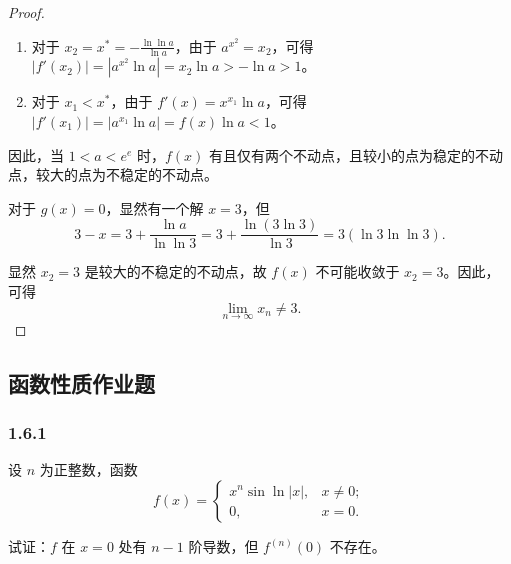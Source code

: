 \documentclass[12pt]{ctexart}
\begin{document}
\begin{proof}
\begin{enumerate}
    \item 对于 $x_2 = x^* = -\frac{\ln \ln a}{\ln a}$，由于 $a^{x^2} = x_2$，可得 $|f'(x_2)| = |a^{x^2} \ln a| = x_2 \ln a > -\ln a > 1$。
    \item 对于 $x_1 < x^*$，由于 $f'(x) = x^{x_1} \ln a$，可得 $|f'(x_1)| = |a^{x_1} \ln a| = f(x) \ln a < 1$。
\end{enumerate}

因此，当 $1 < a < e^{e}$ 时，$f(x)$ 有且仅有两个不动点，且较小的点为稳定的不动点，较大的点为不稳定的不动点。

对于 $g(x) = 0$，显然有一个解 $x = 3$，但
\[
3 - x = 3 + \frac{\ln a}{\ln \ln 3} = 3 + \frac{\ln (3 \ln 3)}{\ln 3} = 3 (\ln 3 \ln \ln 3).
\]

显然 $x_2 = 3$ 是较大的不稳定的不动点，故 $f(x)$ 不可能收敛于 $x_2 = 3$。因此，可得
\[
\lim_{n \to \infty} x_n \neq 3.
\]
\end{proof}

\subsection{函数性质作业题}
\subsubsection*{1.6.1}
设 $n$ 为正整数，函数
\[
f(x) =
\begin{cases} 
x^n \sin \ln |x|, & x \neq 0; \\
0, & x = 0.
\end{cases}
\]

试证：$f$ 在 $x = 0$ 处有 $n-1$ 阶导数，但 $f^{(n)}(0)$ 不存在。
\end{document}
